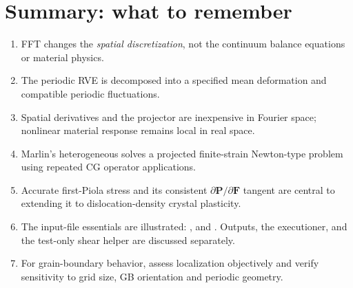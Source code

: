 \documentclass[11pt,a4paper]{article}
\newcommand{\code}[1]{\texttt{\detokenize{#1}}}
\begin{document}
\section{Summary: what to remember}
\begin{enumerate}
\item FFT changes the \emph{spatial discretization}, not the continuum balance equations or material physics.
\item The periodic RVE is decomposed into a specified mean deformation and compatible periodic fluctuations.
\item Spatial derivatives and the projector are inexpensive in Fourier space; nonlinear material response remains local in real space.
\item Marlin's heterogeneous \code{FFTMechanics} solves a projected finite-strain Newton-type problem using repeated CG operator applications.
\item Accurate first-Piola stress and its consistent $\partial\mathbf P/\partial\mathbf F$ tangent are central to extending it to dislocation-density crystal plasticity.
\item The input-file essentials are illustrated: \code{[Domain]}, \code{[TensorComputes]} and \code{[TensorSolver]}. Outputs, the executioner, and the test-only shear helper are discussed separately.
\item For grain-boundary behavior, assess localization objectively and verify sensitivity to grid size, GB orientation and periodic geometry.
\end{enumerate}
\end{document}
